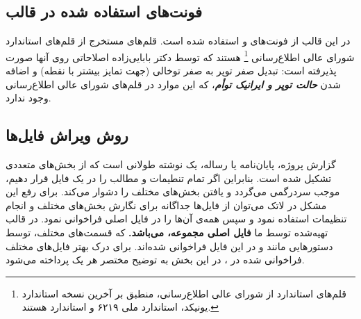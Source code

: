 \subsection{فونت‌های استفاده شده در قالب}
در این قالب از فونت‌های
 و
استفاده شده است.
قلم‌های
مستخرج از قلم‌های استاندارد
شورای عالی اطلاع‌رسانی%
\footnote{
قلم‌های استاندارد
از شورای عالی اطلاع‌رسانی، منطبق بر آخرین نسخه استاندارد یونیکد، استاندارد ملی ۶۲۱۹ و استاندارد
هستند.
}
هستند که توسط دکتر بابایی‌زاده اصلاحاتی روی آنها صورت پذیرفته است: تبدیل صفر توپر به صفر توخالی (جهت تمایز بیشتر با نقطه) و اضافه شدن
\textit{\textbf{حالت توپر و ایرانیک توأم}}،
که این موارد در قلم‌های شورای عالی اطلاع‌رسانی وجود ندارد.


\subsection{روش ویراش فایل‌ها}\label{sec:edit}
گزارش پروژه، پایان‌نامه یا رساله، یک نوشته طولانی است که از بخش‌های متعددی تشکیل شده است. بنابراین اگر تمام تنطیمات و مطالب را در یک فایل قرار دهیم، موجب سردرگمی می‌گردد و یافتن بخش‌های مختلف را دشوار می‌کند. برای رفع این مشکل در لاتک می‌توان از فایل‌ها جداگانه برای نگارش بخش‌های مختلف و انجام تنظیمات استفاده نمود و سپس همه‌ی آن‌ها را در فایل اصلی فراخوانی نمود.
در قالب تهیه‌شده توسط ما  
\textbf{
	فایل اصلی مجموعه،
	می‌باشد.
}
که قسمت‌های مختلف، توسط دستورهایی مانند 
و
در این فایل فراخوانی شده‌اند.
برای درک بهتر فایل‌های مختلف فراخوانی شده در
،
در این بخش به توضیح مختصر هر یک پرداخته می‌شود.

